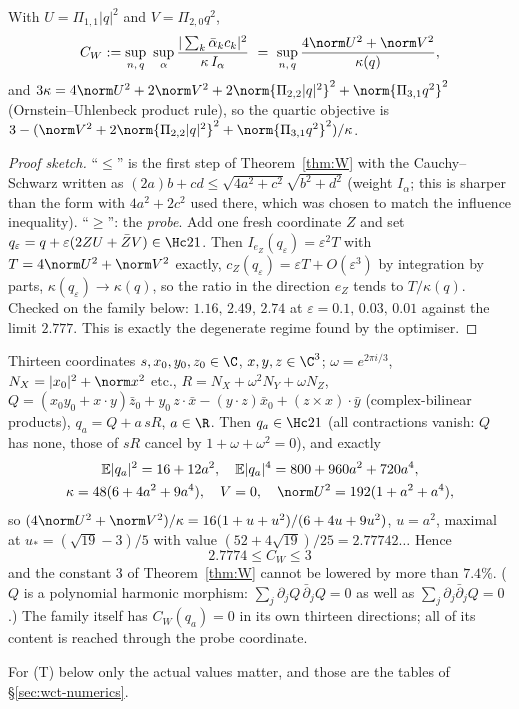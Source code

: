\begin{theorem}\label{thm:quartic}
With $U=\Pi_{1,1}|q|^2$ and $V=\Pi_{2,0}q^2$,
\[
C_W:=\sup_{n,\,q}\ \sup_\alpha\frac{|\sum_k\bar\alpha_kc_k|^2}{\kappa\,I_\alpha}\ =\ \sup_{n,\,q}\frac{4\norm U^2+\norm V^2}{\kappa(q)} ,
\]
and $3\kappa=4\norm U^2+2\norm V^2+2\norm{\Pi_{2,2}|q|^2}^2+\norm{\Pi_{3,1}q^2}^2$ (Ornstein--Uhlenbeck product rule), so the quartic objective is $3-(\norm V^2+2\norm{\Pi_{2,2}|q|^2}^2+\norm{\Pi_{3,1}q^2}^2)/\kappa$.
\end{theorem}
\begin{proof}[Proof sketch]
``$\le$'' is the first step of Theorem~\ref{thm:W} with the Cauchy--Schwarz written as $(2a)b+cd\le\sqrt{4a^2+c^2}\sqrt{b^2+d^2}$ (weight $I_\alpha$; this is sharper than the form with $4a^2+2c^2$ used
there, which was chosen to match the influence inequality). ``$\ge$'': the \emph{probe}. Add one fresh coordinate $Z$ and set $q_\varepsilon=q+\varepsilon(2ZU+\bar ZV)\in\Hc21$. Then
$I_{e_Z}(q_\varepsilon)=\varepsilon^2T$ with $T=4\norm U^2+\norm V^2$ exactly, $c_Z(q_\varepsilon)=\varepsilon T+O(\varepsilon^3)$ by integration by parts, $\kappa(q_\varepsilon)\to\kappa(q)$, so the ratio in the direction $e_Z$
tends to $T/\kappa(q)$. Checked on the family below: $1.16,\,2.49,\,2.74$ at $\varepsilon=0.1,\,0.03,\,0.01$ against the limit $2.777$. This is exactly the degenerate regime found by the optimiser.
\end{proof}
\begin{proposition}\label{prop:family13}
Thirteen coordinates $s,x_0,y_0,z_0\in\C$, $x,y,z\in\C^3$; $\omega=e^{2\pi i/3}$, $N_X=|x_0|^2+\norm x^2$ etc., $R=N_X+\omega^2N_Y+\omega N_Z$,
$Q=(x_0y_0+x\cdot y)\bar z_0+y_0\,z\cdot\bar x-(y\cdot z)\bar x_0+(z\times x)\cdot\bar y$ (complex-bilinear products), $q_a=Q+a\,sR$, $a\in\R$. Then $q_a\in\Hc21$ (all contractions vanish: $Q$
has none, those of $sR$ cancel by $1+\omega+\omega^2=0$), and exactly
\[\begin{gathered}
\E|q_a|^2=16+12a^2,\quad \E|q_a|^4=800+960a^2+720a^4,\\
 \kappa=48(6+4a^2+9a^4),\quad V=0,\quad \norm U^2=192(1+a^2+a^4),
\end{gathered}\]
so $(4\norm U^2+\norm V^2)/\kappa=16(1+u+u^2)/(6+4u+9u^2)$, $u=a^2$, maximal at $u_*=(\sqrt{19}-3)/5$ with value $(52+4\sqrt{19})/25=2.77742\ldots$ Hence
\[
\boxed{\ 2.7774\le C_W\le3\ }
\]
and the constant $3$ of Theorem~\ref{thm:W} cannot be lowered by more than $7.4\%$. ($Q$ is a polynomial harmonic morphism: $\sum_j\partial_jQ\,\bar\partial_jQ=0$ as well as $\sum_j\partial_j\bar\partial_jQ=0$.)
The family itself has $C_W(q_a)=0$ in its own thirteen directions; all of its content is reached through the probe coordinate.
\end{proposition}
For (T) below only the actual values matter, and those are the tables of \S\ref{sec:wct-numerics}.

